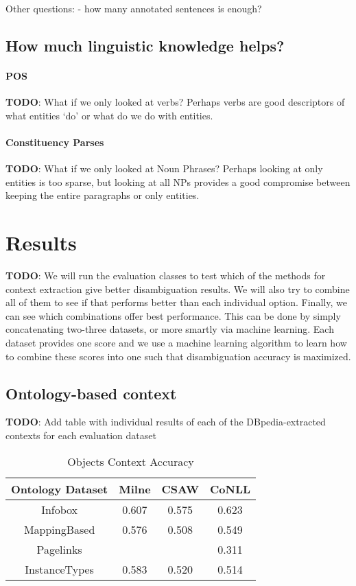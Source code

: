 \documentclass[10pt,a4paper]{article}
\newcommand{\todo}[1]{{\color{red}\textsf{\textbf{TODO}}: #1}}
\begin{document}
Other questions:
- how many annotated sentences is enough?

\subsection{How much linguistic knowledge helps?}

\paragraph{POS}
\todo{What if we only looked at verbs? Perhaps verbs are good descriptors of what entities `do' or what do we do with entities.}

\paragraph{Constituency Parses}
\todo{What if we only looked at Noun Phrases? Perhaps looking at only entities is too sparse, but looking at all NPs provides a good compromise between keeping the entire paragraphs or only entities.}

\section{Results}

\todo{We will run the evaluation classes to test which of the methods for context extraction give better disambiguation results. We will also try to combine all of them to see if that performs better than each individual option. Finally, we can see which combinations offer best performance. This can be done by simply concatenating two-three datasets, or more smartly via machine learning. Each dataset provides one score and we use a machine learning algorithm to learn how to combine these scores into one such that disambiguation accuracy is maximized.}

\subsection{Ontology-based context}



\todo{Add table with individual results of each of the DBpedia-extracted contexts for each evaluation dataset}


\begin{table}[ht] 
\caption{Objects Context Accuracy}
\centering
\begin{tabular}{c c c c}
\hline\hline 
Ontology Dataset	& Milne 	& CSAW 	& CoNLL \\ [0.5ex] 
\hline 
Infobox 			& 0.607	& 0.575	& 0.623 \\ 
MappingBased 		& 0.576 	& 0.508 	& 0.549 \\ 
Pagelinks 			&  		&  		& 0.311 \\ 
InstanceTypes 		& 0.583	& 0.520	& 0.514 \\  [1ex] 
\hline
\end{tabular} 
\label{table:nonlin} 
\end{table} 
\end{document}
